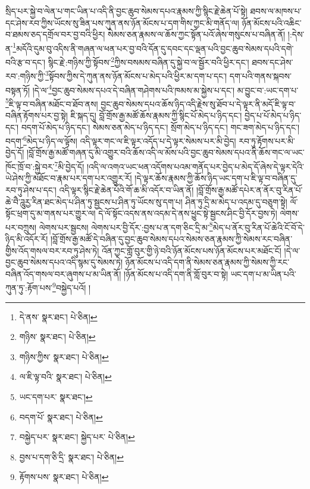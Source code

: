 སྲིད་པར་སྐྱེ་བ་ལེན་པ་གང་ཡིན་པ་འདི་ནི་བྱང་ཆུབ་སེམས་དཔའ་རྣམས་ཀྱི་སྙིང་རྗེ་ཆེན་པོ་སྟེ། ཐབས་ལ་མཁས་པ་དང་ཤེས་རབ་ཀྱིས་ཡོངས་སུ་ཟིན་པས་ཀུན་ནས་ཉོན་མོངས་པ་དག་གིས་ཀྱང་མི་གནོད་ལ། ཉོན་མོངས་པའི་འཆིང་བ་ཐམས་ཅད་དགྲོལ་བར་བྱ་བའི་ཕྱིར། སེམས་ཅན་རྣམས་ལ་ཆོས་ཀྱང་སྟོན་པའོ་ཞེས་གསུངས་པ་བཞིན་ནོ། །:དེས་ན་\footnote{དེ་ནས་  སྣར་ཐང་།  པེ་ཅིན། }མདོའི་དུམ་བུ་འདིས་ནི་གཞན་ལ་ཕན་པར་བྱ་བའི་དོན་དུ་དབང་དང་ལྡན་པའི་བྱང་ཆུབ་སེམས་དཔའི་དགེ་བའི་རྩ་བ་དང་། སྙིང་རྗེ་:གཉིས་ཀྱི་སྟོབས་\footnote{གཉིས་  སྣར་ཐང་།  པེ་ཅིན། }ཀྱིས་བསམས་བཞིན་དུ་སྐྱེ་བ་ལ་སྦྱོར་བའི་ཕྱིར་དང་། ཐབས་དང་ཤེས་རབ་:གཉིས་ཀྱི་\footnote{གཉིས་ཀྱིས་  སྣར་ཐང་།  པེ་ཅིན། }སྟོབས་ཀྱིས་དེ་ཀུན་ནས་ཉོན་མོངས་པ་མེད་པའི་ཕྱིར་མ་དག་པ་དང་། དག་པའི་གནས་སྐབས་བསྟན་ཏོ། །དེ་ལ་\footnote{ལ་ཇི་ལྟ་བའི་  སྣར་ཐང་།  པེ་ཅིན། }བྱང་ཆུབ་སེམས་དཔའ་དེ་བཞིན་གཤེགས་པའི་ཁམས་མ་སྐྱེས་པ་དང་། མ་བྱུང་བ་:ཡང་དག་པ་\footnote{ཡང་དག་པར་  སྣར་ཐང་། }ཇི་ལྟ་བ་བཞིན་མཐོང་བ་ཐོབ་ནས། བྱང་ཆུབ་སེམས་དཔའ་ཆོས་ཉིད་འདི་རྗེས་སུ་ཐོབ་པ་དེ་ལྟར་ནི་མདོ་ཇི་ལྟ་བ་བཞིན་རྟོགས་པར་བྱ་སྟེ། ཇི་སྐད་དུ། བློ་གྲོས་རྒྱ་མཚོ་ཆོས་རྣམས་ཀྱི་སྙིང་པོ་མེད་པ་ཉིད་དང་། བྱེད་པ་པོ་མེད་པ་ཉིད་དང་། བདག་པོ་མེད་པ་ཉིད་དང་། སེམས་ཅན་མེད་པ་ཉིད་དང་། སྲོག་མེད་པ་ཉིད་དང་། གང་ཟག་མེད་པ་ཉིད་དང་། བདག་\footnote{བདག་པོ་  སྣར་ཐང་།  པེ་ཅིན། }མེད་པ་ཉིད་ལ་ལྟོས། འདི་ལྟར་གང་ལ་ཇི་ལྟར་འདོད་པ་དེ་ལྟར་སེམས་པར་མི་བྱེད། རབ་ཏུ་རྟོགས་པར་མི་བྱེད་དོ། །བློ་གྲོས་རྒྱ་མཚོ་གཞན་དུ་མི་འགྱུར་བའི་ཆོས་འདི་ལ་མོས་པའི་བྱང་ཆུབ་སེམས་དཔའ་ནི་ཆོས་གང་ལ་ཡང་ཁོང་ཁྲོ་བ་:སྐྱེ་བར་\footnote{བསྐྱེད་པར་  སྣར་ཐང་། སྐྱེད་པར་  པེ་ཅིན། }མི་བྱེད་དོ། །འདི་ལ་འགའ་ཡང་ཕན་འདོགས་པའམ་གནོད་པར་བྱེད་པ་མེད་དོ་ཞེས་དེ་ལྟར་དེའི་ཡེ་ཤེས་ཀྱི་མཐོང་བ་རྣམ་པར་དག་པར་འགྱུར་རོ། །དེ་ལྟར་ཆོས་རྣམས་ཀྱི་ཆོས་ཉིད་ཡང་དག་པ་ཇི་ལྟ་བ་བཞིན་དུ་རབ་ཏུ་ཤེས་པ་དང་། འདི་ལྟར་སྙིང་རྗེ་ཆེན་པོའི་གོ་ཆ་མི་འདོར་བ་ཡིན་ནོ། །བློ་གྲོས་རྒྱ་མཚོ་དཔེར་ན་ནོར་བུ་རིན་པོ་ཆེ་བཻ་ཌཱུརྱ་རིན་ཐང་མེད་པ་ཤིན་ཏུ་སྦྱངས་པ་ཤིན་ཏུ་ཡོངས་སུ་དག་པ། ཤིན་ཏུ་དྲི་མ་མེད་པ་འདམ་དུ་བཅུག་སྟེ། ལོ་སྟོང་ཕྲག་དུ་མ་གནས་པར་གྱུར་ལ། དེ་ལོ་སྟོང་འདས་ནས་འདམ་དེ་ནས་ཕྱུང་སྟེ་སྦྱངས་ཤིང་བྱི་དོར་བྱས་ཏེ། ལེགས་པར་བཀྲུས། ལེགས་པར་སྦྱངས། ལེགས་པར་བྱི་དོར་:བྱས་པ་ན་དག་ཅིང་དྲི་མ་\footnote{བྱས་པ་དག་ཅི་དྲི་  སྣར་ཐང་།  པེ་ཅིན། }མེད་པ་ནོར་བུ་རིན་པོ་ཆེའི་ངོ་བོ་དེ་ཉིད་མི་འདོར་རོ། །བློ་གྲོས་རྒྱ་མཚོ་དེ་བཞིན་དུ་བྱང་ཆུབ་སེམས་དཔའ་སེམས་ཅན་རྣམས་ཀྱི་སེམས་རང་བཞིན་གྱིས་འོད་གསལ་བར་རབ་ཏུ་ཤེས་ཏེ། འོན་ཀྱང་གློ་བུར་གྱི་ཉེ་བའི་ཉོན་མོངས་པས་ཉོན་མོངས་པར་མཐོང་ངོ། །དེ་ལ་བྱང་ཆུབ་སེམས་དཔའ་འདི་སྙམ་དུ་སེམས་ཏེ། ཉོན་མོངས་པ་འདི་དག་ནི་སེམས་ཅན་རྣམས་ཀྱི་སེམས་ཀྱི་རང་བཞིན་འོད་གསལ་བར་ཞུགས་པ་མ་ཡིན་ནོ། །ཉོན་མོངས་པ་འདི་དག་ནི་གློ་བུར་བ་སྟེ། ཡང་དག་པ་མ་ཡིན་པའི་ཀུན་ཏུ་:རྟོག་པས་\footnote{རྟོགས་པས་  སྣར་ཐང་།  པེ་ཅིན། }བསྐྱེད་པའོ། །
